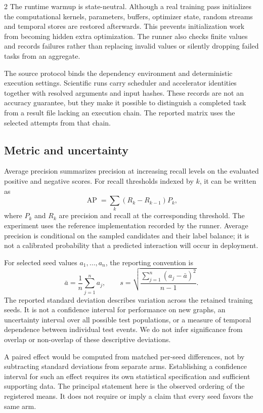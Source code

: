 \documentclass[a4paper,10pt]{article}
\newcommand{\AP}{\operatorname{AP}}
\begin{document}
\begin{multicols}{2}
The runtime warmup is state-neutral. Although a real training pass initializes the computational kernels, parameters, buffers, optimizer state, random streams and temporal stores are restored afterwards. This prevents initialization work from becoming hidden extra optimization. The runner also checks finite values and records failures rather than replacing invalid values or silently dropping failed tasks from an aggregate.

The source protocol binds the dependency environment and deterministic execution settings. Scientific runs carry scheduler and accelerator identities together with resolved arguments and input hashes. These records are not an accuracy guarantee, but they make it possible to distinguish a completed task from a result file lacking an execution chain. The reported matrix uses the selected attempts from that chain.

\subsection{Metric and uncertainty}
Average precision summarizes precision at increasing recall levels on the evaluated positive and negative scores. For recall thresholds indexed by $k$, it can be written as
\begin{equation}
\AP=\sum_k (R_k-R_{k-1})P_k,
\label{eq:ap}
\end{equation}
where $P_k$ and $R_k$ are precision and recall at the corresponding threshold. The experiment uses the reference implementation recorded by the runner. Average precision is conditional on the sampled candidates and their label balance; it is not a calibrated probability that a predicted interaction will occur in deployment.

For selected seed values $a_1,\ldots,a_n$, the reporting convention is
\begin{equation}
\bar a=\frac{1}{n}\sum_{j=1}^n a_j,\qquad
s=\sqrt{\frac{\sum_{j=1}^n(a_j-\bar a)^2}{n-1}}.
\label{eq:mean}
\end{equation}
The reported standard deviation describes variation across the retained training seeds. It is not a confidence interval for performance on new graphs, an uncertainty interval over all possible test populations, or a measure of temporal dependence between individual test events. We do not infer significance from overlap or non-overlap of these descriptive deviations.

A paired effect would be computed from matched per-seed differences, not by subtracting standard deviations from separate arms. Establishing a confidence interval for such an effect requires its own statistical specification and sufficient supporting data. The principal statement here is the observed ordering of the registered means. It does not require or imply a claim that every seed favors the same arm.


\end{multicols}
\end{document}
